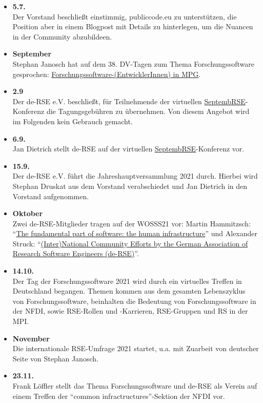 \begin{itemize}
  \item \textbf{5.7.}\\Der Vorstand beschließt einstimmig, publiccode.eu zu unterstützen, die Position aber in einem Blogpost mit Details zu hinterlegen, um die Nuancen in der Community abzubildeen.
\item \textbf{September}\\Stephan Janosch hat auf dem 38. DV-Tagen zum Thema Forschungssoftware gesprochen: \href{https://doi.org/10.6084/m9.figshare.16706374}{Forschungssoftware-(EntwicklerInnen) in MPG}.
\item \textbf{2.9}\\Der de-RSE e.V. beschließt, für Teilnehmende der virtuellen \href{https://septembrse.society-rse.org/}{SeptembRSE}-Konferenz die Tagungsgebühren zu übernehmen. Von diesem Angebot wird im Folgenden kein Gebrauch gemacht.
  \item \textbf{6.9.}\\Jan Dietrich stellt de-RSE auf der virtuellen \href{https://septembrse.society-rse.org/}{SeptembRSE}-Konferenz vor.
 \item \textbf{15.9.}\\Der de-RSE e.V. führt die Jahreshauptversammlung 2021 durch. Hierbei wird Stephan Druskat aus dem Vorstand verabschiedet und Jan Dietrich in den Vorstand aufgenommen.
 \item \textbf{Oktober}\\Zwei de-RSE-Mitglieder tragen auf der WOSSS21 vor: Martin Hammitzsch: ``\href{https://wosss.org/wosss21/S4-MartinHammitzsch}{The fundamental part of software: the human infrastructure}'' und Alexander Struck: ``\href{https://wosss.org/wosss21/S4-AlexanderStruck}{(Inter)National Community Efforts by the German Association of Research Software Engineers (de-RSE)}''.
 \item \textbf{14.10.}\\Der Tag der Forschungssoftware 2021 wird durch ein virtuelles Treffen in Deutschland begangen. Themen kommen aus dem gesamten Lebenszyklus von Forschungssoftware, beinhalten die Bedeutung von Forschungssoftware in der NFDI, sowie RSE-Rollen und -Karrieren, RSE-Gruppen und RS in der MPI.
 \item \textbf{November}\\Die internationale RSE-Umfrage 2021 startet, u.a. mit Zuarbeit von deutscher Seite von Stephan Janosch.
 \item \textbf{23.11.}\\Frank Löffler stellt das Thema Forschungssoftware und de-RSE als Verein auf einem Treffen der ``common infractructures''-Sektion der NFDI vor.

\end{itemize}
